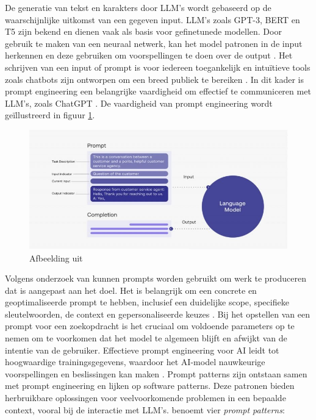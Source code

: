 \medspace

De generatie van tekst en karakters door LLM's wordt gebaseerd op de waarschijnlijke uitkomst van een gegeven input. LLM's zoals GPT-3, BERT en T5 zijn bekend en dienen vaak als basis voor gefinetunede modellen. Door gebruik te maken van een neuraal netwerk, kan het model patronen in de input herkennen en deze gebruiken om voorspellingen te doen over de output \autocite{Liu2020}. Het schrijven van een input of prompt is voor iedereen toegankelijk en intuïtieve tools zoals chatbots zijn ontworpen om een breed publiek te bereiken \autocite{McFarland2023}. In dit kader is prompt engineering een belangrijke vaardigheid om effectief te communiceren met LLM's, zoals ChatGPT \autocite{Harwell2023}. De vaardigheid van prompt engineering wordt geïllustreerd in figuur \ref{img:prompt-engineering}.

\medspace

\begin{figure}[H]
	\begin{center}
		\includegraphics[width=14cm]{img/prompt-engineering-medium.png}
	\end{center}
	\caption{Afbeelding uit \textcite{McFarland2023}}
	\label{img:prompt-engineering}
\end{figure}

\medspace

Volgens onderzoek van \textcite{Liu2020} kunnen prompts worden gebruikt om werk te produceren dat is aangepast aan het doel. Het is belangrijk om een concrete en geoptimaliseerde prompt te hebben, inclusief een duidelijke scope, specifieke sleutelwoorden, de context en gepersonaliseerde keuzes \autocite{McFarland2023}. Bij het opstellen van een prompt voor een zoekopdracht is het cruciaal om voldoende parameters op te nemen om te voorkomen dat het model te algemeen blijft en afwijkt van de intentie van de gebruiker. Effectieve prompt engineering voor AI leidt tot hoogwaardige trainingsgegevens, waardoor het AI-model nauwkeurige voorspellingen en beslissingen kan maken \autocite{Liu2020}. Prompt patterns zijn ontstaan samen met prompt engineering en lijken op software patterns. Deze patronen bieden herbruikbare oplossingen voor veelvoorkomende problemen in een bepaalde context, vooral bij de interactie met LLM's. \textcite{White2023} benoemt vier \textit{prompt patterns}:

